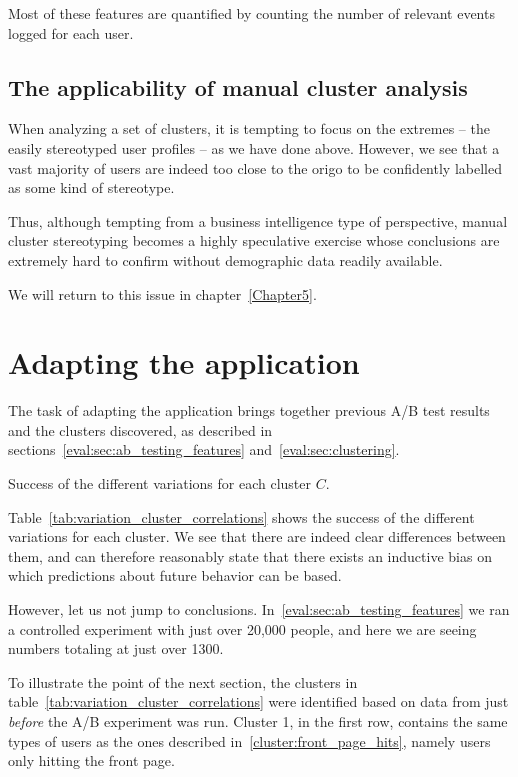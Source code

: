 Most of these features are quantified by counting the number of relevant events logged for each user.

\subsection{The applicability of manual cluster analysis}
\label{eval:sub:cluster_analysis_applicability}

When analyzing a set of clusters, it is tempting to focus on the extremes -- the easily stereotyped user profiles -- as we have done above. However, we see that a vast majority of users are indeed too close to the origo to be confidently labelled as some kind of stereotype.

Thus, although tempting from a business intelligence type of perspective, manual cluster stereotyping becomes a highly speculative exercise whose conclusions are extremely hard to confirm without demographic data readily available.

We will return to this issue in chapter~\ref{Chapter5}.

\section{Adapting the application} %
\label{eval:sec:adapting_the_application}

The task of adapting the application brings together previous A/B test results and the clusters discovered, as described in sections~\ref{eval:sec:ab_testing_features} and~\ref{eval:sec:clustering}.

\begin{table}[h]
  \centering
  
  \caption{Success of the different variations for each cluster $C$.}
  \label{tab:variation_cluster_correlations}
\end{table}

Table~\ref{tab:variation_cluster_correlations} shows the success of the different variations for each cluster. We see that there are indeed clear differences between them, and can therefore reasonably state that there exists an inductive bias on which predictions about future behavior can be based.

However, let us not jump to conclusions. In~\ref{eval:sec:ab_testing_features} we ran a controlled experiment with just over 20,000 people, and here we are seeing numbers totaling at just over 1300.

To illustrate the point of the next section, the clusters in table~\ref{tab:variation_cluster_correlations} were identified based on data from just \emph{before} the A/B experiment was run. Cluster 1, in the first row, contains the same types of users as the ones described in~\ref{cluster:front_page_hits}, namely users only hitting the front page.

